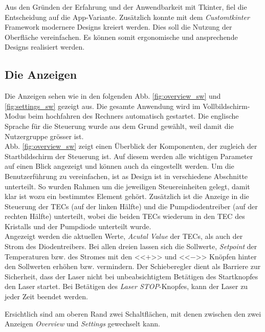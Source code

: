 Aus den Gründen der Erfahrung und der Anwendbarkeit mit Tkinter, fiel die Entscheidung auf die App-Variante. Zusätzlich konnte mit dem \textit{Customtkinter} Framework modernere Designs kreiert werden. Dies soll die Nutzung der Oberfläche vereinfachen. Es können somit ergonomische und ansprechende Designs realisiert werden.

\subsection{Die Anzeigen}
Die Anzeigen sehen wie in den folgenden Abb. \ref{fig:overview_sw} und \ref{fig:settings_sw} gezeigt aus. Die gesamte Anwendung wird im Vollbildschirm-Modus beim hochfahren des Rechners automatisch gestartet. Die englische Sprache für die Steuerung wurde aus dem Grund gewählt, weil damit die Nutzergruppe grösser ist.\\
Abb. \ref{fig:overview_sw} zeigt einen Überblick der Komponenten, der zugleich der Startbildschirm der Steuerung ist. Auf diesem werden alle wichtigen Parameter auf einen Blick angezeigt und können auch da eingestellt werden. Um die Benutzerführung zu vereinfachen, ist as Design ist in verschiedene Abschnitte unterteilt. So wurden Rahmen um die jeweiligen Steuereinheiten gelegt, damit klar ist wozu ein bestimmtes Element gehört. Zusätzlich ist die Anzeige in die Steuerung der TECs (auf der linken Hälfte) und die Pumpdiodentreiber (auf der rechten Hälfte) unterteilt, wobei die beiden TECs wiederum in den TEC des Kristalls und der Pumpdiode unterteilt wurde.\\
Angezeigt werden die aktuellen Werte, \textit{Acutal Value} der TECs, als auch der Strom des Diodentreibers. Bei allen dreien lassen sich die Sollwerte, \textit{Setpoint} der Temperaturen bzw. des Stromes mit den <<$+$>> und <<$-$>> Knöpfen hinter den Sollwerten erhöhen bzw. vermindern.
Der Schieberegler dient als Barriere zur Sicherheit, dass der Laser nicht bei unbeabsichtigtem Betätigen des Startknopfes den Laser startet. Bei Betätigen des \textit{Laser STOP}-Knopfes, kann der Laser zu jeder Zeit beendet werden.

Ersichtlich sind am oberen Rand zwei Schaltflächen, mit denen zwischen den zwei Anzeigen \textit{Overview} und \textit{Settings} gewechselt kann.

